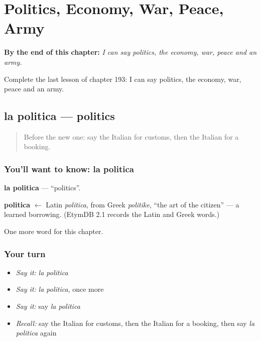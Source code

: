 
\chapter{Politics, Economy, War, Peace, Army}
\label{ch:it-politics-economy-war-peace-army}

\begin{chapteropening}
\textbf{By the end of this chapter:} \emph{I can say politics, the economy, war, peace and an army.}

Complete the last lesson of chapter 193: I can say politics, the economy, war, peace and an army.
\end{chapteropening}

\section[la politica]{la politica — politics}

\label{lesson:IT-C193-politica}



\begin{quote}
Before the new one: say the Italian for customs, then the Italian for a booking.
\end{quote}

\subsection*{You'll want to know: la politica}
\textbf{la politica} — \textquotedblleft{}politics\textquotedblright{}.

\begin{cousinweb}
\textbf{politica} $\leftarrow$ Latin \emph{politica}, from Greek \emph{politike}, \textquotedblleft{}the art of the citizen\textquotedblright{} — a learned borrowing. (EtymDB 2.1 records the Latin and Greek words.)
\end{cousinweb}

\begin{grammarlens}[title={What you've built}]
One more word for this chapter.
\end{grammarlens}

\subsection*{Your turn}
\begin{itemize}
\raggedright
  \item \emph{Say it:} \emph{la politica}
  \item \emph{Say it:} \emph{la politica}, once more
  \item \emph{Say it:} say \emph{la politica}
  \item \emph{Recall:} say the Italian for customs, then the Italian for a booking, then say \emph{la politica} again
\end{itemize}

